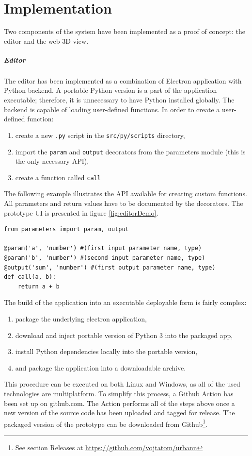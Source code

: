 \chapter{Implementation}
Two components of the system have been implemented as a proof of concept: the editor and the web 3D view.

\paragraph{Editor} The editor has been implemented as a combination of Electron application with Python backend. A portable Python version is a part of the application executable; therefore, it is unnecessary to have Python installed globally. The backend is capable of loading user-defined functions. In order to create a user-defined function:
\begin{enumerate}
    \item create a new \verb|.py| script in the \verb|src/py/scripts| directory,
    \item import the \verb|param| and \verb|output| decorators from the parameters module (this is the only necessary API),
    \item create a function called \verb|call|
\end{enumerate}
The following example illustrates the API available for creating custom functions. All parameters and return values have to be documented by the decorators. The prototype UI is presented in figure \ref{fig:editorDemo}.
\begin{verbatim}
from parameters import param, output

@param('a', 'number') #(first input parameter name, type)
@param('b', 'number') #(second input parameter name, type)
@output('sum', 'number') #(first output parameter name, type)
def call(a, b):
    return a + b
\end{verbatim}

The build of the application into an executable deployable form is fairly complex:
\begin{enumerate}
    \item package the underlying electron application,
    \item download and inject portable version of Python 3 into the packaged app,
    \item install Python dependencies locally into the portable version,
    \item and package the application into a downloadable archive.
\end{enumerate}
This procedure can be executed on both Linux and Windows, as all of the used technologies are multiplatform. To simplify this process, a Github Action has been set up on github.com. The Action performs all of the steps above once a new version of the source code has been uploaded and tagged for release. The packaged version of the prototype can be downloaded from Github\footnote{See section Releases at \url{https://github.com/vojtatom/urbann}}.

